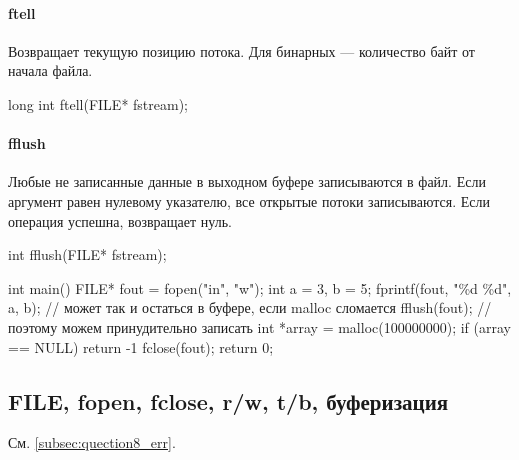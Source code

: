 \paragraph{ftell}
Возвращает текущую позицию потока. Для бинарных --- количество байт от начала файла.
\begin{ccode}
long int ftell(FILE* fstream);
\end{ccode}
\paragraph{fflush}
Любые не записанные данные в выходном буфере записываются в файл. Если аргумент равен нулевому указателю, все открытые потоки записываются. Если операция успешна, возвращает нуль.
\begin{ccode}
int fflush(FILE* fstream);

int main() {
    FILE* fout = fopen("in", "w");
    int a = 3, b = 5;
    fprintf(fout, "\%d \%d", a, b); // может так и остаться в буфере, если malloc сломается
    fflush(fout); // поэтому можем принудительно записать
    int *array = malloc(100000000);
    if (array == NULL)
	return -1
    fclose(fout);
    return 0;
}
\end{ccode}
\subsection{FILE, fopen, fclose, r/w, t/b, буферизация} 
См. \ref{subsec:quection8_err}.
